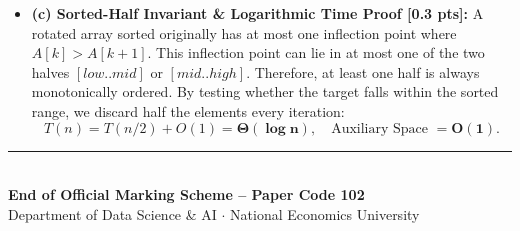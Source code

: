 \documentclass[11pt,a4paper]{article}
\begin{document}
\begin{solutionbox}
\begin{itemize}
\begin{itemize}
        \item \textbf{Iteration 2 [0.2 pts]:} $low = 0, high = 2 \implies mid = 1$ ($A[1] = 7$).
        $A[0] = 6 \le A[1] = 7 \implies$ Left half $A[0..1] = [6, 7]$ is sorted.
        Test target: is $1 \in [6, 7)$? False ($1 < 6$). Discard left half: \texttt{low = mid + 1 = 2}.
        \item \textbf{Iteration 3 [0.1 pts]:} $low = 2, high = 2 \implies mid = 2$ ($A[2] = 1$).
        $A[2] == 1 == target \implies$ \textbf{Match found! Return index 2}.
    \end{itemize}
    \item \textbf{(c) Sorted-Half Invariant \& Logarithmic Time Proof [0.3 pts]:}
    A rotated array sorted originally has at most one inflection point where $A[k] > A[k+1]$. This inflection point can lie in at most one of the two halves $[low..mid]$ or $[mid..high]$. Therefore, at least one half is always monotonically ordered.
    By testing whether the target falls within the sorted range, we discard half the elements every iteration:
    \[
    T(n) = T(n/2) + O(1) = \mathbf{\Theta(\log n)}, \quad \text{Auxiliary Space } = \mathbf{O(1)}.
    \]
\end{itemize}
\end{solutionbox}

\vspace{0.8em}
\begin{center}
\rule{0.6\textwidth}{0.6pt}\\[0.3em]
{\small\color{ForestGreen}\textbf{End of Official Marking Scheme -- Paper Code 102}}\\[0.15em]
{\footnotesize\color{DarkGray}Department of Data Science \& AI $\cdot$ National Economics University}
\end{center}
\end{document}
